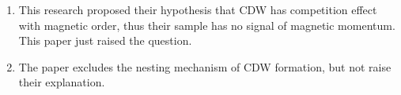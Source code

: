 \begin{enumerate}
    \item This research proposed their hypothesis that CDW has competition effect with magnetic order, thus their sample has no signal of magnetic momentum. This paper just raised the question.
    \item The paper excludes the nesting mechanism of CDW formation, but not raise their explanation.
\end{enumerate}
